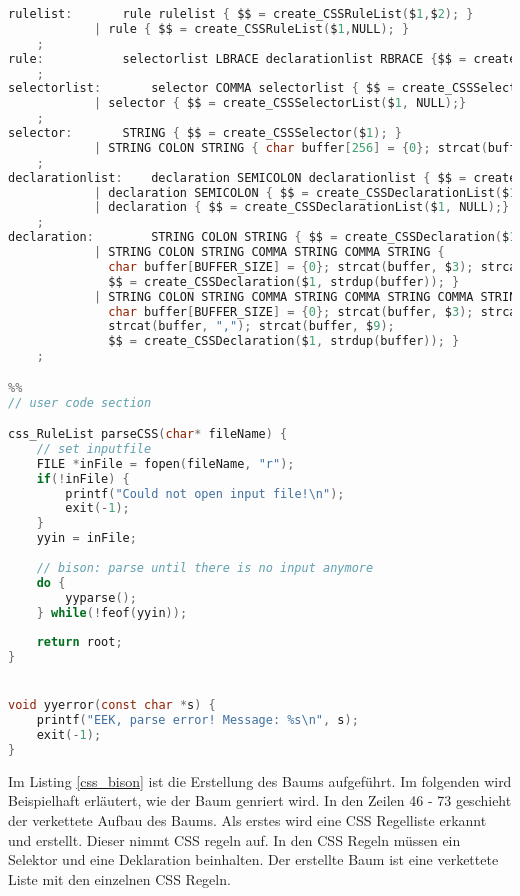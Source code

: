 \begin{lstlisting}[label=css_biso,language=C, caption=Baumgenerierung mit Bison]
rulelist:		rule rulelist { $$ = create_CSSRuleList($1,$2); }
			| rule { $$ = create_CSSRuleList($1,NULL); }
	;
rule:			selectorlist LBRACE declarationlist RBRACE {$$ = create_CSSRule($1, $3); }
	;
selectorlist:		selector COMMA selectorlist { $$ = create_CSSSelectorList($1,$3);}
			| selector { $$ = create_CSSSelectorList($1, NULL);}
	;			
selector:		STRING { $$ = create_CSSSelector($1); }
			| STRING COLON STRING { char buffer[256] = {0}; strcat(buffer, $1); strcat(buffer, ":"); strcat(buffer, $3);  $$ = create_CSSSelector(strdup(buffer)); }
	;
declarationlist: 	declaration SEMICOLON declarationlist { $$ = create_CSSDeclarationList($1,$3);}
			| declaration SEMICOLON { $$ = create_CSSDeclarationList($1, NULL);}
			| declaration { $$ = create_CSSDeclarationList($1, NULL);}
	;				
declaration:		STRING COLON STRING { $$ = create_CSSDeclaration($1, $3); }
			| STRING COLON STRING COMMA STRING COMMA STRING { 
			  char buffer[BUFFER_SIZE] = {0}; strcat(buffer, $3); strcat(buffer, ","); strcat(buffer, $5); strcat(buffer, ","); strcat(buffer, $7);
			  $$ = create_CSSDeclaration($1, strdup(buffer)); }
			| STRING COLON STRING COMMA STRING COMMA STRING COMMA STRING { 
			  char buffer[BUFFER_SIZE] = {0}; strcat(buffer, $3); strcat(buffer, ","); strcat(buffer, $5); strcat(buffer, ","); strcat(buffer, $7);
			  strcat(buffer, ","); strcat(buffer, $9); 
			  $$ = create_CSSDeclaration($1, strdup(buffer)); }
	;

%%
// user code section

css_RuleList parseCSS(char* fileName) {
    // set inputfile
    FILE *inFile = fopen(fileName, "r");
    if(!inFile) {
        printf("Could not open input file!\n");
        exit(-1);
    }
    yyin = inFile;
    
    // bison: parse until there is no input anymore
    do {
        yyparse();
    } while(!feof(yyin));
   	
    return root;
}


void yyerror(const char *s) {
    printf("EEK, parse error! Message: %s\n", s);
    exit(-1);
}
\end{lstlisting}

Im Listing \ref{css_bison} ist die Erstellung des Baums aufgeführt. Im folgenden wird Beispielhaft erläutert, wie der Baum genriert wird. In den Zeilen 46 - 73 geschieht der verkettete Aufbau des Baums. Als erstes wird eine CSS Regelliste erkannt und erstellt. Dieser nimmt CSS regeln auf. In den CSS Regeln müssen ein Selektor und eine Deklaration beinhalten. Der erstellte Baum ist eine verkettete Liste mit den einzelnen CSS Regeln.

